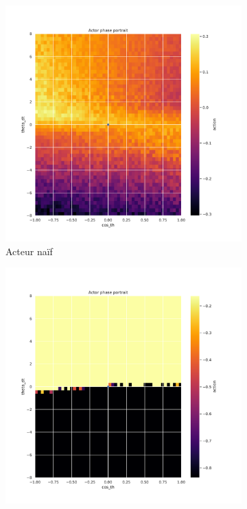 \begin{figure}[H]
    \centering
    \begin{subfigure}{0.3\textwidth}
        \includegraphics[width=\textwidth]{figures/iteration4/0_actor_normalize__ante_Pendulum-v0.pdf}
        \caption{Acteur naïf}
    \end{subfigure}
    \begin{subfigure}{0.3\textwidth}
        \includegraphics[width=\textwidth]{figures/iteration4/0_actor_normalize__post_Pendulum-v0.pdf}

\end{subfigure}
\end{figure}
